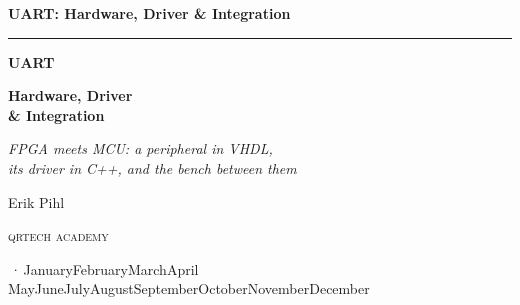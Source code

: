 %
\providecommand{\bookversion}{}
\newcommand{\bookdate}{\number\day\space\ifcase\month\or January\or February\or March\or April\or
  May\or June\or July\or August\or September\or October\or November\or December\fi\space
  \number\year}
\newcommand{\bookedition}{\ifx\bookversion\empty\else\bookversion\,·\,\fi\bookdate}

\thispagestyle{empty}
\vspace*{2.2in}
\begin{flushright}
  {\Large\bfseries UART: Hardware, Driver \& Integration}
\end{flushright}
\cleardoublepage

\thispagestyle{empty}
\vspace*{1.1in}
\begin{flushleft}
  {\color{accent}\rule{0.9in}{2.5pt}}\par\vspace{1.4ex}
  {\fontsize{32}{38}\selectfont\bfseries UART\par}
  \vspace{0.6ex}
  {\fontsize{24}{29}\selectfont\bfseries Hardware, Driver\\[0.15ex] \& Integration\par}
  \vspace{2.2ex}
  {\Large\itshape FPGA meets MCU: a peripheral in VHDL,\\its driver in C++, and the bench between
    them\par}
  \vspace{1.0in}
  {\large Erik Pihl\par}
  \vfill
  {\small\scshape\lsstyle qrtech academy\par}
  \vspace{0.6ex}
  {\small\color{muted} \bookedition\par}
\end{flushleft}
\newpage

